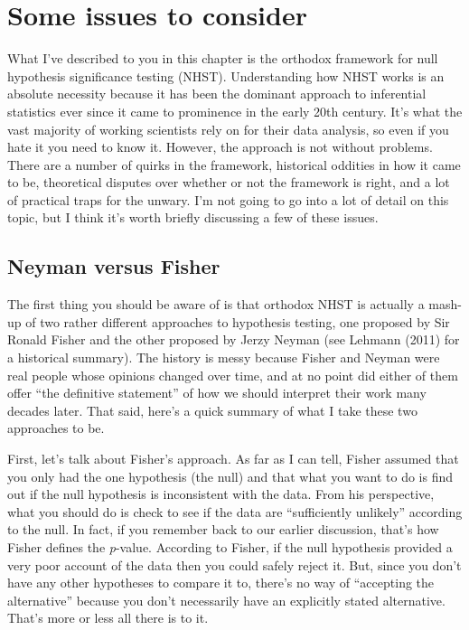 \documentclass[
  a4paper,
]{book}
\begin{document}
\hypertarget{some-issues-to-consider}{%
\section{Some issues to consider}\label{some-issues-to-consider}}

What I've described to you in this chapter is the orthodox framework for
null hypothesis significance testing (NHST). Understanding how NHST
works is an absolute necessity because it has been the dominant approach
to inferential statistics ever since it came to prominence in the early
20th century. It's what the vast majority of working scientists rely on
for their data analysis, so even if you hate it you need to know it.
However, the approach is not without problems. There are a number of
quirks in the framework, historical oddities in how it came to be,
theoretical disputes over whether or not the framework is right, and a
lot of practical traps for the unwary. I'm not going to go into a lot of
detail on this topic, but I think it's worth briefly discussing a few of
these issues.

\hypertarget{neyman-versus-fisher}{%
\subsection{Neyman versus Fisher}\label{neyman-versus-fisher}}

The first thing you should be aware of is that orthodox NHST is actually
a mash-up of two rather different approaches to hypothesis testing, one
proposed by Sir Ronald Fisher and the other proposed by Jerzy Neyman
(see Lehmann (2011) for a historical summary). The history is messy
because Fisher and Neyman were real people whose opinions changed over
time, and at no point did either of them offer ``the definitive
statement'' of how we should interpret their work many decades later.
That said, here's a quick summary of what I take these two approaches to
be.

First, let's talk about Fisher's approach. As far as I can tell, Fisher
assumed that you only had the one hypothesis (the null) and that what
you want to do is find out if the null hypothesis is inconsistent with
the data. From his perspective, what you should do is check to see if
the data are ``sufficiently unlikely'' according to the null. In fact,
if you remember back to our earlier discussion, that's how Fisher
defines the \emph{p}-value. According to Fisher, if the null hypothesis
provided a very poor account of the data then you could safely reject
it. But, since you don't have any other hypotheses to compare it to,
there's no way of ``accepting the alternative'' because you don't
necessarily have an explicitly stated alternative. That's more or less
all there is to it.
\end{document}
